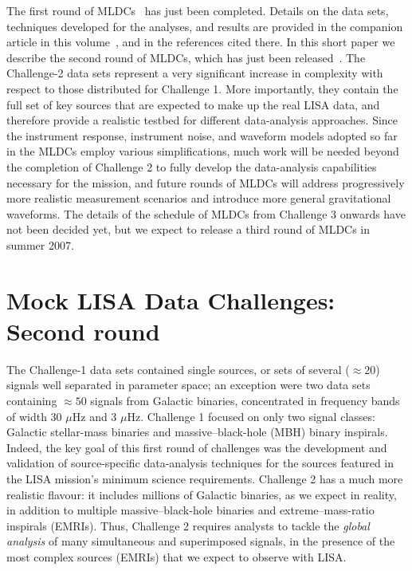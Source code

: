 \documentclass{iopart}
\begin{document}
The first round of MLDCs~\cite{MLDCLISA06a,MLDCLISA06b} has just been completed. Details on the data sets, techniques developed for the analyses, and results are provided in the companion article in this volume~\cite{MLDC1-gwdaw}, and in the references cited there. In this short paper we describe the second round of MLDCs, which has just been released~\cite{MLDCweb}. The Challenge-2 data sets represent a very significant increase in complexity with respect to those distributed for Challenge 1. More importantly, they contain the full set of key sources that are expected to make up the real LISA data, and therefore provide a realistic testbed for different data-analysis approaches. Since the instrument response, instrument noise, and waveform models adopted so far in the MLDCs employ various simplifications, much work will be needed beyond the completion of Challenge 2 to fully develop the data-analysis capabilities necessary for the mission, and future rounds of MLDCs will address progressively more realistic measurement scenarios and introduce more general gravitational waveforms. The details of the schedule of MLDCs from Challenge 3 onwards have not been decided yet, but we expect to release a third round of MLDCs in summer 2007.

\section{Mock LISA Data Challenges: Second round}
\label{s:MLDC2}

The Challenge-1 data sets contained single sources, or sets of several ($\approx 20$) signals well separated in parameter space; an exception were two data sets containing $\approx 50$ signals from Galactic binaries, concentrated in frequency bands of width 30 $\mu$Hz and 3 $\mu$Hz. Challenge 1 focused on only two signal classes: Galactic stellar-mass binaries and massive--black-hole (MBH) binary inspirals. Indeed, the key goal of this first round of challenges was the development and validation of source-specific data-analysis techniques for the sources featured in the LISA mission's minimum science requirements. Challenge 2 has a much more realistic flavour: it includes millions of Galactic binaries,
as we expect in reality, in addition to multiple massive--black-hole binaries and extreme--mass-ratio inspirals (EMRIs). Thus, Challenge 2 requires analysts to tackle the \emph{global analysis} of many simultaneous and superimposed signals, in the presence of the most complex sources (EMRIs) that we expect to observe with LISA.
\end{document}
